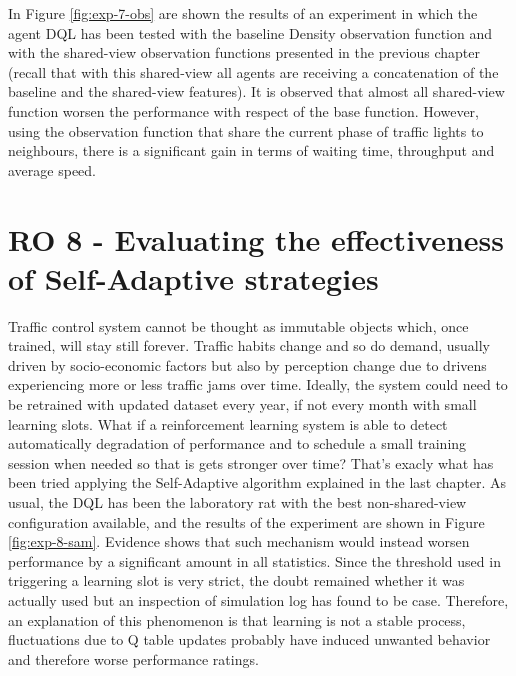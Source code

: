 
In Figure \ref{fig:exp-7-obs} are shown the results of an experiment in which the agent DQL has been tested with the baseline Density observation function and with the shared-view observation functions presented in the previous chapter (recall that with this shared-view all agents are receiving a concatenation of the baseline and the shared-view features).
It is observed that almost all shared-view function worsen the performance with respect of the base function.
However, using the observation function that share the current phase of traffic lights to neighbours, there is a significant gain in terms of waiting time, throughput and average speed.


% 

\section{RO 8 - Evaluating the effectiveness of Self-Adaptive strategies}

Traffic control system cannot be thought as immutable objects which, once trained, will stay still forever.
Traffic habits change and so do demand, usually driven by socio-economic factors but also by perception change due to drivens experiencing more or less traffic jams over time.
Ideally, the system could need to be retrained with updated dataset every year, if not every month with small learning slots.
What if a reinforcement learning system is able to detect automatically degradation of performance and to schedule a small training session when needed so that is gets stronger over time?
That's exacly what has been tried applying the Self-Adaptive algorithm explained in the last chapter.
As usual, the DQL has been the laboratory rat with the best non-shared-view configuration available, and the results of the experiment are shown in Figure \ref{fig:exp-8-sam}.
Evidence shows that such mechanism would instead worsen performance by a significant amount in all statistics.
Since the threshold used in triggering a learning slot is very strict, the doubt remained whether it was actually used but an inspection of simulation log has found to be case.
Therefore, an explanation of this phenomenon is that learning is not a stable process, fluctuations due to Q table updates probably have induced unwanted behavior and therefore worse performance ratings.

